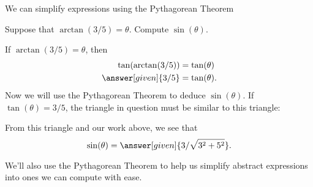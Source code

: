 \documentclass{ximera}
\begin{document}
We can simplify expressions using the Pythagorean Theorem

\begin{example}
  Suppose that $\arctan(3/5) = \theta$. Compute $\sin(\theta)$.
  \begin{explanation}
    If $\arctan(3/5) = \theta$, then
    \begin{align*}
    \tan(\arctan(3/5)) &= \tan(\theta)\\
    \answer[given]{3/5} &= \tan(\theta).
    \end{align*}
    Now we will use the Pythagorean Theorem to deduce
    $\sin(\theta)$. If $\tan(\theta)=3/5$, the triangle in question must
    be similar to this triangle:
    \begin{image}[2in]
    \end{image}
    From this triangle and our work above, we see that
    \[
    \sin(\theta) = \answer[given]{3/\sqrt{3^2+5^2}}.
    \]
  \end{explanation}
\end{example}



We'll also use the Pythagorean Theorem to help us simplify abstract
expressions into ones we can compute with ease.
\end{document}
